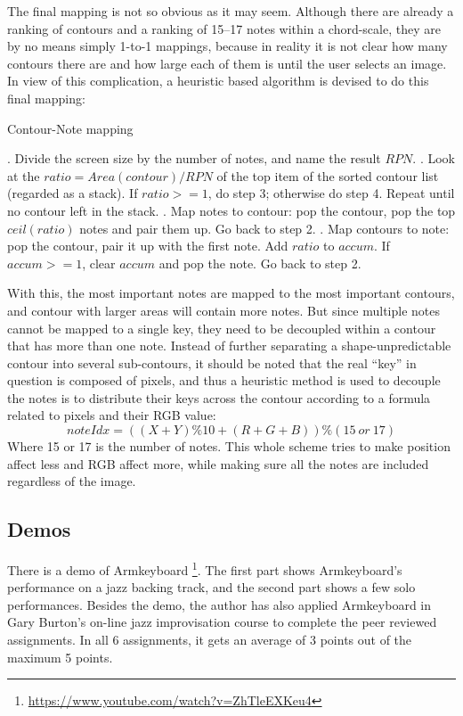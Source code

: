 The final mapping is not so obvious as it may seem. Although there are already a ranking of contours and a ranking of 15--17 notes within a chord-scale, they are by no means simply 1-to-1 mappings, because in reality it is not clear how many contours there are and how large each of them is until the user selects an image. In view of this complication, a heuristic based algorithm is devised to do this final mapping:
\begin{algorithm}
\caption{Contour-Note mapping}
\begin{algorithmic}
. Divide the screen size by the number of notes, and name the result $RPN$.
. Look at the $ ratio = Area(contour) / RPN $ of the top item of the sorted contour list (regarded as a stack). \newline If $ratio>=1$, do step	3; otherwise do step 4. Repeat until no contour left in the stack.
. Map notes to contour: pop the contour, pop the top $ ceil(ratio)$ notes and pair them up. Go back to step 2.
. Map contours to note: pop the contour, pair it up with the first	note. Add $ratio$ to $accum$. If $accum>=1$, clear $accum$ and pop the note. Go back to step 2.
\end{algorithmic}
\end{algorithm}
With this, the most important notes are mapped to the most important contours, and contour with larger areas will contain more notes. But since multiple notes cannot be mapped to a single key, they need to be decoupled  within a contour that has more than one note. Instead of further separating a shape-unpredictable contour into several sub-contours, it should be noted that the real ``key'' in question is composed of pixels, and thus a heuristic method is used to decouple the notes is to distribute their keys across the contour according to a formula related to pixels and their RGB value:
\begin{equation}
\mathit{noteIdx = ((X + Y) \% 10 + (R + G + B)) \% (15\ or\ 17)}
\end{equation}
Where 15 or 17 is the number of notes. This whole scheme tries to make position affect less
and RGB affect more, while making sure all the notes are included regardless of the image.

\subsection{Demos}
There is a demo of Armkeyboard \footnote{\url{https://www.youtube.com/watch?v=ZhTleEXKeu4}}. The first part shows Armkeyboard's performance on a jazz backing track, and the second part shows a few solo performances. Besides the demo, the author has also applied Armkeyboard in Gary Burton's on-line jazz improvisation course to complete the peer reviewed assignments. In all 6 assignments, it gets an average of 3 points out of the maximum 5 points.


